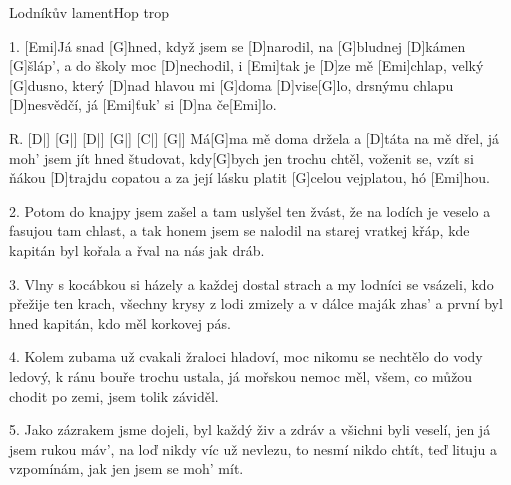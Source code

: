 \begin{song}{Lodníkův lament}{Hop trop}

\begin{xverse}{1. }
[Emi]Já snad [G]hned, když jsem se [D]narodil,
na [G]bludnej [D]kámen [G]{šláp'},
a do školy moc [D]nechodil, i [Emi]tak je [D]ze mě [Emi]chlap,
velký [G]dusno, který [D]nad hlavou mi [G]doma [D]vise[G]lo,
drsnýmu chlapu [D]nesvědčí,
já [Emi]{ťuk'} si [D]na če[Emi]lo.
\end{xverse}


\begin{xverse}{R. }
[D|]{} [G|]{} [D|]{} [G|]{} [C|]{} [G|]{}
Má[G]ma mě doma držela a [D]táta na mě dřel,
já moh' jsem jít hned študovat, kdy[G]bych jen trochu chtěl,
voženit se, vzít si ňákou [D]trajdu copatou
a za její lásku platit [G]celou vejplatou, hó [Emi]hou.
\end{xverse}


\begin{xverse}{2. }
Potom do knajpy jsem zašel a tam uslyšel ten žvást,
že na lodích je veselo a fasujou tam chlast,
a tak honem jsem se nalodil na starej vratkej křáp,
kde kapitán byl kořala a řval na nás jak dráb.
\end{xverse}


\begin{xverse}{3. }
Vlny s kocábkou si házely a každej dostal strach
a my lodníci se vsázeli, kdo přežije ten krach,
všechny krysy z lodi zmizely a v dálce maják zhas'
a první byl hned kapitán, kdo měl korkovej pás.
\end{xverse}


\begin{xverse}{4. }
Kolem zubama už cvakali žraloci hladoví,
moc nikomu se nechtělo do vody ledový,
k ránu bouře trochu ustala, já mořskou nemoc měl,
všem, co můžou chodit po zemi, jsem tolik záviděl.
\end{xverse}

\begin{xverse}{5. }
Jako zázrakem jsme dojeli, byl každý živ a zdráv
a všichni byli veselí, jen já jsem rukou máv',
na loď nikdy víc už nevlezu, to nesmí nikdo chtít,
teď lituju a vzpomínám, jak jen jsem se moh' mít.
\end{xverse}

\end{song}

